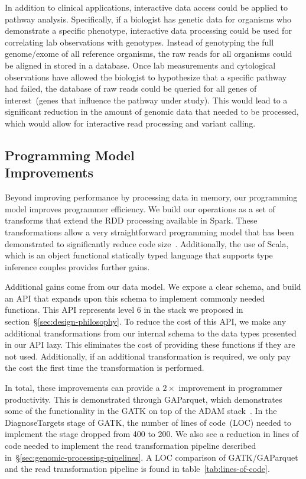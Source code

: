 \documentclass[10pt,twocolumn]{article}
\theoremstyle{plain}
\begin{document}
In addition to clinical applications, interactive data access could be applied to pathway analysis. Specifically, if a biologist has
genetic data for organisms who demonstrate a specific phenotype, interactive data processing could be used for correlating
lab observations with genotypes. Instead of genotyping the full genome/exome of all reference organisms, the raw reads for
all organisms could be aligned in stored in a database. Once lab measurements and cytological observations have allowed
the biologist to hypothesize that a specific pathway had failed, the database of raw reads could be queried for all genes of
interest~(genes that influence the pathway under study). This would lead to a significant reduction in the amount of genomic
data that needed to be processed, which would allow for interactive read processing and variant calling.

\subsection{Programming Model\\Improvements}
\label{sec:programming-model-improvements}

Beyond improving performance by processing data in memory, our programming model improves programmer efficiency.
We build our operations as a set of transforms that extend the RDD processing available in Spark. These transformations
allow a very straightforward programming model that has been demonstrated to significantly reduce code size~\cite{zaharia12}.
Additionally, the use of Scala, which is an object functional statically typed language that supports type inference couples
provides further gains.

Additional gains come from our data model. We expose a clear schema, and build an API that expands upon this schema
to implement commonly needed functions. This API represents level 6 in the stack we proposed in
section~\S\ref{sec:design-philosophy}. To reduce the cost of this API, we make any additional transformations from our
internal schema to the data types presented in our API lazy. This eliminates the cost of providing these functions if they are
not used. Additionally, if an additional transformation is required, we only pay the cost the first time the transformation is performed.

In total, these improvements can provide a $2\times$ improvement in programmer productivity. This is demonstrated through
GAParquet, which demonstrates some of the functionality in the GATK on top of the ADAM stack~\cite{gaparquet}. In the
DiagnoseTargets stage of GATK, the number of lines of code~(LOC) needed to implement the stage dropped from 400 to
200. We also see a reduction in lines of code needed to implement the read transformation pipeline described
in~\S\ref{sec:genomic-processing-pipelines}. A LOC comparison of GATK/GAParquet and the read transformation pipeline
is found in table~\ref{tab:lines-of-code}.
\end{document}
